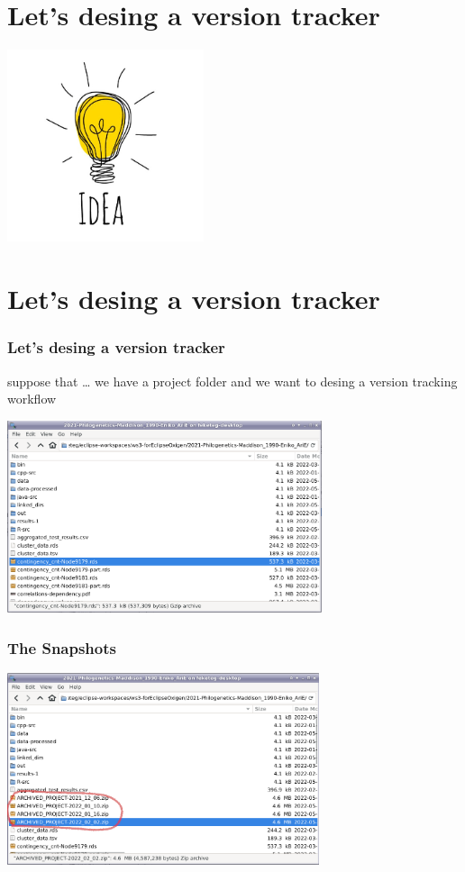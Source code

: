 \documentclass[aspectratio=169]{beamer}
\begin{document}
\section{Let's desing a version tracker}
\begin{frame}
\includegraphics[height=160pt]{pictures/idea.jpg}
\end{frame}

 
\section{Let's desing a version tracker}
\begin{frame}
\frametitle<presentation>{Let's desing a version tracker}
suppose that \dots
  we have a project folder and we want to desing a version tracking workflow

\includegraphics[height=160pt]{pictures/project_folder.png}
\end{frame}

\begin{frame}
\frametitle<presentation>{The Snapshots}
\includegraphics[height=160pt]{pictures/project_folder_with_dated_zips.png}
\end{frame}
\end{document}
